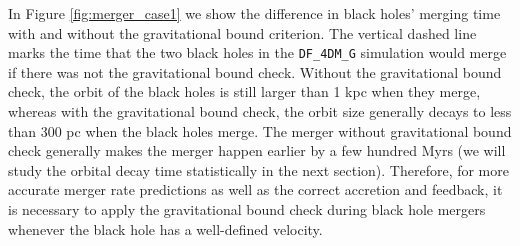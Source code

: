  In Figure \ref{fig:merger_case1} we show the difference in black holes' merging time with and without the gravitational bound criterion. The vertical dashed line marks the time that the two black holes in the \texttt{DF\_4DM\_G} simulation would merge if there was not the gravitational bound check. Without the gravitational bound check, the orbit of the black holes is still larger than 1 kpc when they merge, whereas with the gravitational bound check, the orbit size generally decays to less than 300 pc when the black holes merge. The merger without gravitational bound check generally makes the merger happen earlier by a few hundred Myrs (we will study the orbital decay time statistically in the next section). Therefore, for more accurate merger rate predictions as well as the correct accretion and feedback, it is necessary to apply the gravitational bound check during black hole mergers whenever the black hole has a well-defined velocity.
 


